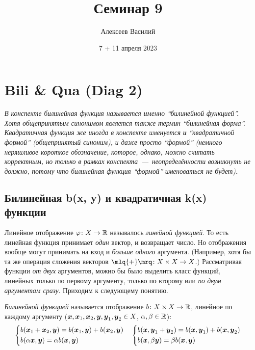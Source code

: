 \documentclass[a4paper,12pt]{article}
\author{Алексеев Василий}
\title{Семинар 9}
\date{7 + 11 апреля 2023}
\begin{document}
  \maketitle
  
  \tableofcontents

  \thispagestyle{empty}
  
  \newpage
  


  \section{Bili \& Qua (Diag 2)}
  
  \emph{
    В конспекте билинейная функция называется именно ``билинейной функцией''.
    Хотя общепринятым синонимом является также термин ``билинейная форма''.
    Квадратичная функция же иногда в конспекте именуется и ``квадратичной формой'' (общепринятый синоним), и даже просто ``формой'' (немного неряшливое короткое обозначение, которое, однако, можно считать корректным, но только в рамках конспекта~---~неопределённости возникнуть не должно, потому что билинейная функция ``формой'' именоваться не будет).
  }
  
  \subsection{Билинейная b(x, y) и квадратичная k(x) функции}
  
  Линейное отображение $\phi\colon X \hm\to \RR$ называлось \emph{линейной функцией}.
  То есть линейная функция принимает \emph{один} вектор, и возвращает число.
  Но отображения вообще могут принимать на вход и \emph{больше одного} аргумента.
  (Например, хотя бы та же операция сложения векторов $\mlq{+}\mrq\colon X \hm\times X \hm\to X$.)
  Рассматривая функции \emph{от двух} аргументов, можно бы было выделить класс функций, линейных только по первому аргументу, только по второму или \emph{по двум аргументам сразу}.
  Приходим к следующему понятию.
  
  \begin{definition}
    \emph{Билинейной функцией} называется отображение $b\colon X \hm\times X \hm\to \RR$, линейное по каждому аргументу ($\bds x, \bds x_1, \bds x_2, \bds y, \bds y_1, \bds y_2 \hm\in X$, $\alpha, \beta \hm\in \RR$):
    \[
      \left\{
        \begin{aligned}
          &b(\boldsymbol x_1 + \boldsymbol x_2, \boldsymbol y) = b(\boldsymbol x_1, \boldsymbol y) + b(\boldsymbol x_2, \boldsymbol y)\\
          &b(\alpha \boldsymbol x, \boldsymbol y) = \alpha b(\boldsymbol x, \boldsymbol y)
        \end{aligned}
      \right.
      \quad \left\{
        \begin{aligned}
          &b(\boldsymbol x, \boldsymbol y_1 + \boldsymbol y_2) = b(\boldsymbol x, \boldsymbol y_1) + b(\boldsymbol x, \boldsymbol y_2)\\
          &b(\boldsymbol x, \beta \boldsymbol y) = \beta b(\boldsymbol x, \boldsymbol y)
        \end{aligned}
      \right.
    \]
  \end{definition}
  
\end{document}
